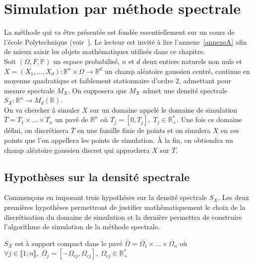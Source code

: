 \chapter{Simulation par méthode spectrale}

\label{spectralMeth}
La méthode qui va être présentée est fondée essentiellement sur un cours de l'école Polytechnique (voir~\cite{FogliCoursX}). Le lecteur
est invité à lire l'annexe~\ref{annexeA} afin de mieux saisir les objets mathématiques utilisés dans ce chapitre.\\


Soit $(\Omega, F, \mathbb{P})$ un espace probabilisé, $n$ et $d$ deux entiers naturels non nuls et
$X = (X_1, \dots, X_d) : \mathbb{R}^n \times \Omega \rightarrow \mathbb{R}^d$ un champ aléatoire gaussien centré,
continue en moyenne quadratique et faiblement stationnaire d'ordre 2, admettant pour mesure spectrale $M_X$.
On supposera que $M_X$ admet une densité spectrale $S_X: \mathbb{R}^n \rightarrow M_d(\mathbb{R})$.\\

On va chercher à simuler $X$ sur un domaine appelé le domaine de simulation $\overline{T} = \overline{T_1} \times \dots \times \overline{T_n} $
un pavé de $\mathbb{R}^n$ où $\overline{T_j} = [0,T_j], \; T_j \in \mathbb{R}^{*}_{+}$. Une fois ce domaine défini, on discrétisera $\overline{T}$ en
une famille finie de points et on simulera $X$ en ces points que l'on appellera les points de simulation. \uppercase{à} la fin, on obtiendra un champ aléatoire gaussien
discret qui approchera $X$ sur $\overline{T}$.


\section{Hypothèses sur la densité spectrale}

Commençons en imposant trois hypothèses sur la densité spectrale $S_X$. Les deux premières hypothèses permettront de justifier mathématiquement le choix de la discrétisation du domaine de
simulation et la dernière permettra de construire l'algorithme de simulation de la méthode spectrale.
\begin{hypothesis}
$S_X$ est à support compact dans le pavé $\overline{\Omega} = \overline{\Omega_{1}} \times \dots \times \overline{\Omega_{n}}$ où $\forall j \in \llbracket 1; n \rrbracket , \; \overline{\Omega_{j}} = [-\Omega_{cj},\Omega_{cj}], \; \Omega_{cj} \in \mathbb{R}^{*}_{+}$ \label{hyp1}
\end{hypothesis}

